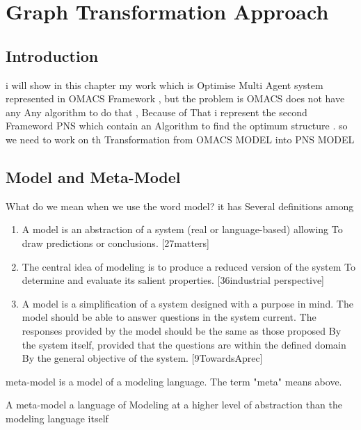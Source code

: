 
\chapter{\label{cha: Graph Transformation Approach }Graph Transformation Approach}

\section{ Introduction }
i will show in this chapter my work which is Optimise Multi Agent system  
represented in OMACS Framework , but the problem is OMACS does not have any 
Any algorithm to do that , Because of That i represent the second Frameword PNS which contain an Algorithm 
to find the optimum structure . so we need to work on th Transformation from OMACS MODEL into PNS MODEL



 
\section{Model and Meta-Model }

What do we mean when we use the word model? it has Several definitions
among

\begin{enumerate}
\item A model is an abstraction of a system (real or language-based) allowing
To draw predictions or conclusions. \cite{ch3-matters}[27matters]
\item The central idea of ​​modeling is to produce a reduced version of the system To determine and evaluate its salient properties. \cite{ch3-selic}[36industrial perspective]

\item A model is a simplification of a system designed with a purpose in mind.
The model should be able to answer questions in the system
current. The responses provided by the model should be the same as those proposed By the system itself, provided that the questions are within the defined domain By the general objective of the system. \cite{ch3-def} [9TowardsAprec]



\end{enumerate}

meta-model is a model of a modeling language.
The term "meta" means above.

A meta-model  a language of Modeling at a higher level of abstraction than the modeling language itself
  
